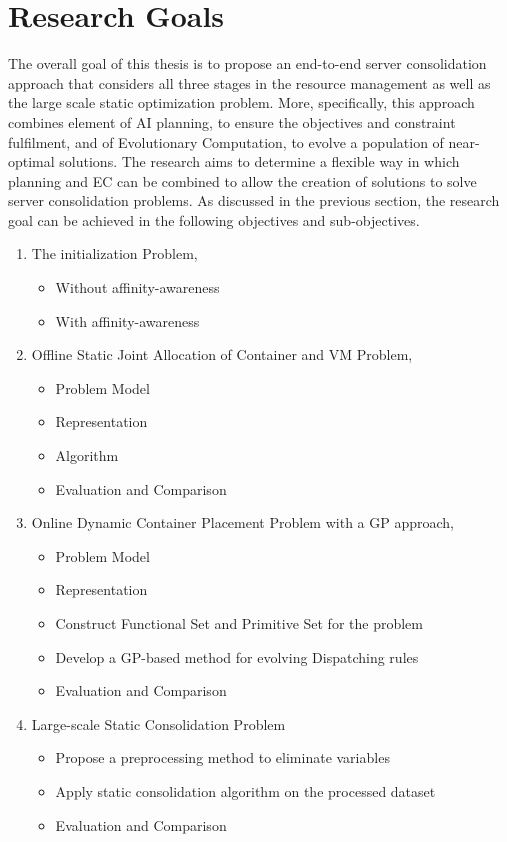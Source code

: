 \section{Research Goals}
The overall goal of this thesis is to propose an end-to-end server consolidation approach that considers all three stages in the resource management as well as the large scale static optimization problem. More, specifically, this approach combines element of AI planning, to ensure the objectives and constraint fulfilment, and of Evolutionary Computation, to evolve a population of near-optimal solutions. The research aims to determine a flexible way in which planning and EC can be combined to allow the creation of solutions to solve server consolidation problems. As discussed in the previous section, the research goal can be achieved in the following objectives and sub-objectives.


\begin{enumerate}
	\item The initialization Problem, 
	\begin{itemize}
		\item Without affinity-awareness
		\item With affinity-awareness
	\end{itemize}

	\item Offline Static Joint Allocation of Container and VM Problem,
	\begin{itemize}
		\item Problem Model
		\item Representation
		\item Algorithm
		\item Evaluation and Comparison
	\end{itemize}

	\item Online Dynamic Container Placement Problem with a GP approach,
	\begin{itemize}
		\item Problem Model
		\item Representation
		\item Construct Functional Set and Primitive Set for the problem
		\item Develop a GP-based method for evolving Dispatching rules
		\item Evaluation and Comparison
	\end{itemize}

	\item Large-scale Static Consolidation Problem
	\begin{itemize}
		\item Propose a preprocessing method to eliminate variables
		\item Apply static consolidation algorithm on the processed dataset
		\item Evaluation and Comparison
	\end{itemize}
\end{enumerate}


